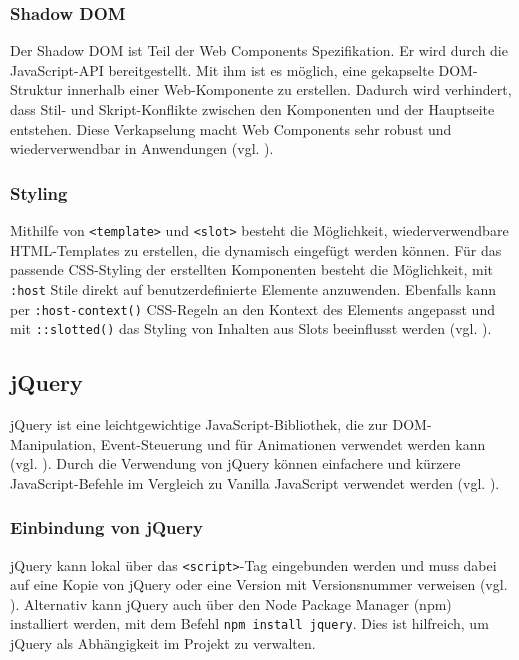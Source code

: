 \documentclass[oneside]{ausarbeitung}
\begin{document}
\subsubsection{Shadow DOM}
Der Shadow DOM ist Teil der Web Components Spezifikation. Er wird durch die JavaScript-API bereitgestellt. Mit ihm ist es möglich, eine gekapselte DOM-Struktur innerhalb einer Web-Komponente zu erstellen. Dadurch wird verhindert, dass Stil- und Skript-Konflikte zwischen den Komponenten und der Hauptseite entstehen. Diese Verkapselung macht Web Components sehr robust und wiederverwendbar in Anwendungen (vgl. \parencite{webcomponents}).

\subsubsection{Styling}
Mithilfe von \texttt{<template>} und \texttt{<slot>} besteht die Möglichkeit, wiederverwendbare \ac{HTML}-Templates zu erstellen, die dynamisch eingefügt werden können. Für das passende \ac{CSS}-Styling der erstellten Komponenten besteht die Möglichkeit, mit \texttt{:host} Stile direkt auf benutzerdefinierte Elemente anzuwenden. Ebenfalls kann per \texttt{:host-context()} \ac{CSS}-Regeln an den Kontext des Elements angepasst und mit \texttt{::slotted()} das Styling von Inhalten aus Slots beeinflusst werden (vgl. \parencite{webcomponents}).


\subsection{jQuery}
jQuery ist eine leichtgewichtige JavaScript-Bibliothek, die zur DOM-Manipulation, Event-Steuerung und für Animationen verwendet werden kann (vgl. \parencite{jquery_api}).  
Durch die Verwendung von jQuery können einfachere und kürzere JavaScript-Befehle im Vergleich zu Vanilla JavaScript verwendet werden (vgl. \parencite{jquery_api}).  

\subsubsection{Einbindung von jQuery}

jQuery kann lokal über das \texttt{\textless script\textgreater}-Tag eingebunden werden und muss dabei auf eine Kopie von jQuery oder eine Version mit Versionsnummer verweisen (vgl. \parencite{jquery_api}).  
Alternativ kann jQuery auch über den Node Package Manager (npm) installiert werden, mit dem Befehl \texttt{npm install jquery}. Dies ist hilfreich, um jQuery als Abhängigkeit im Projekt zu verwalten. 
\end{document}
